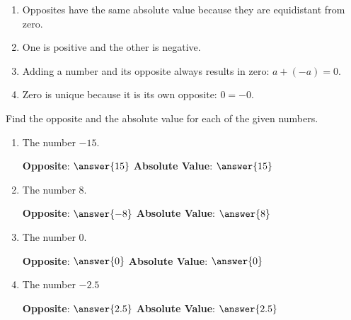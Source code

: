 \documentclass{ximera}[font=12pt]
\begin{document}
\begin{enumerate}
\item Opposites have the same absolute value because they are equidistant from zero.

\item One is positive and the other is negative.

\item Adding a number and its opposite always results in zero: $a +(-a) = 0.$

\item Zero is unique because it is its own opposite: $0= -0.$

\end{enumerate}


\begin{problem}
Find the opposite and the absolute value for each of the given numbers. \\

\begin{enumerate}
    \item The number $-15.$ 
    
    \textcolor{accessibleOrange}{\textbf{Opposite}}: $\answer{15}$ \hspace{70pt} \textcolor{accessibleOrange}{\textbf{Absolute Value}}: $\answer{15}$
    
    \item The number $8.$  
    
     \textcolor{accessibleOrange}{\textbf{Opposite}}: $\answer{-8}$ \hspace{70pt}  \textcolor{accessibleOrange}{\textbf{Absolute Value}}: $\answer{8}$
    
    \item The number $0.$ 
    
     \textcolor{accessibleOrange}{\textbf{Opposite}}: $\answer{0}$ \hspace{40pt}  \textcolor{accessibleOrange}{\textbf{Absolute Value}}: $\answer{0}$
    
    \item The number $-2.5$
    
     \textcolor{accessibleOrange}{\textbf{Opposite}}: $\answer{2.5}$ \hspace{40pt}  \textcolor{accessibleOrange}{\textbf{Absolute Value}}: $\answer{2.5}$
\end{enumerate}
\end{problem}
\end{document}
